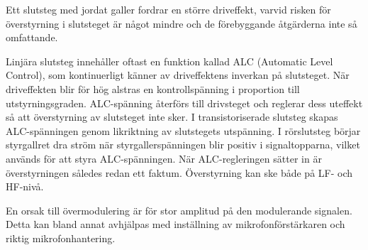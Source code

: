 Ett slutsteg med jordat galler fordrar en större driveffekt, varvid
risken för överstyrning i slutsteget är något mindre och de
förebyggande åtgärderna inte så omfattande.

Linjära slutsteg innehåller oftast en funktion kallad ALC (Automatic Level
Control), som kontinuerligt känner av driveffektens inverkan på slutsteget.
När driveffekten blir för hög alstras en kontrollspänning i proportion till
utstyrningsgraden.
ALC-spänning återförs till drivsteget och reglerar dess uteffekt så att
överstyrning av slutsteget inte sker.
I transistoriserade slutsteg skapas ALC-spänningen genom likriktning av
slutstegets utspänning.
I rörslutsteg börjar styrgallret dra ström när styrgallerspänningen
blir positiv i signaltopparna, vilket används för att styra ALC-spänningen.
När ALC-regleringen sätter in är överstyrningen således redan ett faktum.
Överstyrning kan ske både på LF- och HF-nivå.

En orsak till övermodulering är för stor amplitud på den modulerande signalen.
Detta kan bland annat avhjälpas med inställning av mikrofonförstärkaren och
riktig mikrofonhantering.
